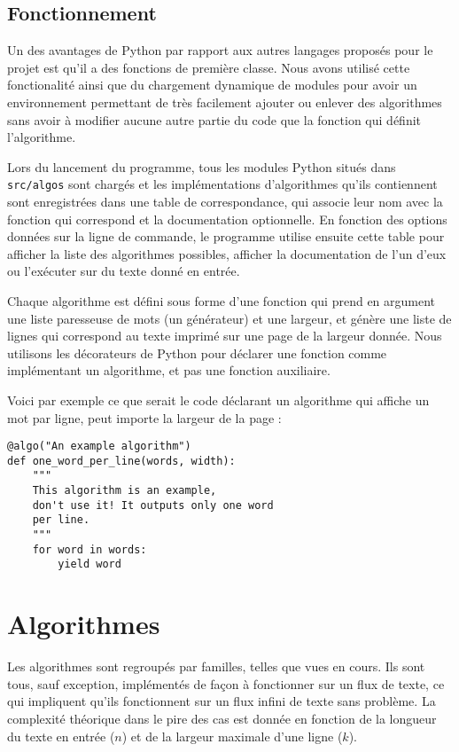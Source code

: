 \documentclass{article}
\begin{document}
\section{Fonctionnement}

Un des avantages de Python par rapport aux autres langages proposés pour le
projet est qu'il a des fonctions de première classe. Nous avons utilisé cette
fonctionalité ainsi que du chargement dynamique de modules pour avoir un
environnement permettant de très facilement ajouter ou enlever des algorithmes
sans avoir à modifier aucune autre partie du code que la fonction qui définit
l'algorithme.

Lors du lancement du programme, tous les modules Python situés dans
\verb|src/algos| sont chargés et les implémentations d'algorithmes qu'ils
contiennent sont enregistrées dans une table de correspondance, qui associe leur
nom avec la fonction qui correspond et la documentation optionnelle. En fonction
des options données sur la ligne de commande, le programme utilise ensuite cette
table pour afficher la liste des algorithmes possibles, afficher la
documentation de l'un d'eux ou l'exécuter sur du texte donné en entrée.

Chaque algorithme est défini sous forme d'une fonction qui prend en argument une
liste paresseuse de mots (un générateur) et une largeur, et génère une liste
de lignes qui correspond au texte imprimé sur une page de la largeur donnée.
Nous utilisons les décorateurs de Python pour déclarer une fonction comme
implémentant un algorithme, et pas une fonction auxiliaire.

Voici par exemple ce que serait le code déclarant un algorithme qui affiche un
mot par ligne, peut importe la largeur de la page :

\begin{verbatim}
@algo("An example algorithm")
def one_word_per_line(words, width):
    """
    This algorithm is an example,
    don't use it! It outputs only one word
    per line.
    """
    for word in words:
        yield word
\end{verbatim}

\chapter{Algorithmes}

Les algorithmes sont regroupés par familles, telles que vues en cours. Ils sont
tous, sauf exception, implémentés de façon à fonctionner sur un flux de texte,
ce qui impliquent qu'ils fonctionnent sur un flux infini de texte sans problème.
La complexité théorique dans le pire des cas est donnée en fonction de la
longueur du texte en entrée ($n$) et de la largeur maximale d'une ligne ($k$).
\end{document}
